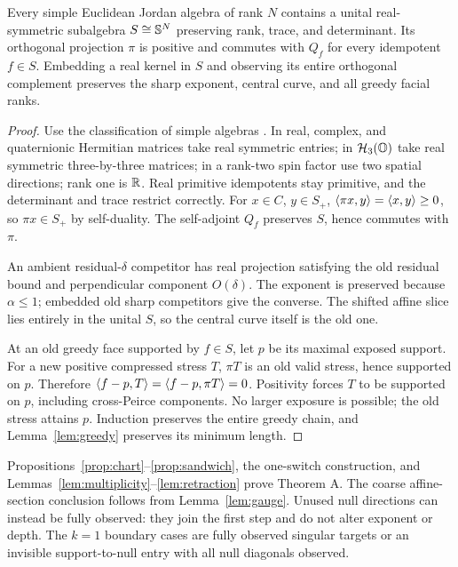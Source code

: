 \begin{lemma}\label{lem:retraction}
Every simple Euclidean Jordan algebra of rank $N$ contains a unital real-symmetric subalgebra $S\cong\mathbb S^N$ preserving rank, trace, and determinant. Its orthogonal projection $\pi$ is positive and commutes with $Q_f$ for every idempotent $f\in S$. Embedding a real kernel in $S$ and observing its entire orthogonal complement preserves the sharp exponent, central curve, and all greedy facial ranks.
\end{lemma}
\begin{proof}
Use the classification of simple algebras \cite{FK94}. In real, complex, and quaternionic Hermitian matrices take real symmetric entries; in $\mathcal H_3(\mathbb O)$ take real symmetric three-by-three matrices; in a rank-two spin factor use two spatial directions; rank one is $\mathbb R$. Real primitive idempotents stay primitive, and the determinant and trace restrict correctly. For $x\in C$, $y\in S_+$, $\langle \pi x,y\rangle=\langle x,y\rangle\ge0$, so $\pi x\in S_+$ by self-duality. The self-adjoint $Q_f$ preserves $S$, hence commutes with $\pi$.

An ambient residual-$\delta$ competitor has real projection satisfying the old residual bound and perpendicular component $O(\delta)$. The exponent is preserved because $\alpha\le1$; embedded old sharp competitors give the converse. The shifted affine slice lies entirely in the unital $S$, so the central curve itself is the old one.

At an old greedy face supported by $f\in S$, let $p$ be its maximal exposed support. For a new positive compressed stress $T$, $\pi T$ is an old valid stress, hence supported on $p$. Therefore $\langle f-p,T\rangle=\langle f-p,\pi T\rangle=0$. Positivity forces $T$ to be supported on $p$, including cross-Peirce components. No larger exposure is possible; the old stress attains $p$. Induction preserves the entire greedy chain, and Lemma~\ref{lem:greedy} preserves its minimum length.
\end{proof}
Propositions~\ref{prop:chart}--\ref{prop:sandwich}, the one-switch construction, and Lemmas~\ref{lem:multiplicity}--\ref{lem:retraction} prove Theorem A. The coarse affine-section conclusion follows from Lemma~\ref{lem:gauge}. Unused null directions can instead be fully observed: they join the first step and do not alter exponent or depth. The $k=1$ boundary cases are fully observed singular targets or an invisible support-to-null entry with all null diagonals observed.
